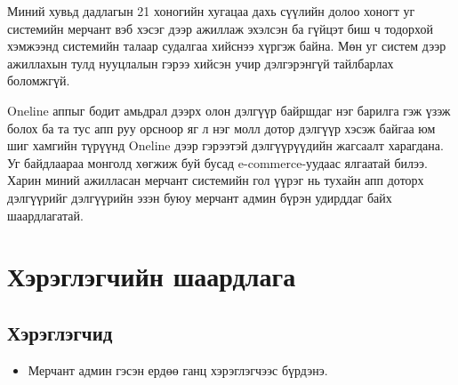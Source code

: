 Миний хувьд дадлагын 21 хоногийн хугацаа дахь сүүлийн долоо хоногт уг системийн мерчант вэб хэсэг дээр ажиллаж эхэлсэн ба гүйцэт биш ч тодорхой хэмжээнд системийн талаар судалгаа хийснээ хүргэж байна. Мөн уг систем дээр ажиллахын тулд нууцлалын гэрээ хийсэн учир дэлгэрэнгүй тайлбарлах боломжгүй. 

\quad \quad Oneline аппыг бодит амьдрал дээрх олон дэлгүүр байршдаг нэг барилга гэж үзэж болох ба та тус апп руу орсноор яг л нэг молл дотор дэлгүүр хэсэж байгаа юм шиг хамгийн түрүүнд Oneline дээр гэрээтэй дэлгүүрүүдийн жагсаалт харагдана. Уг байдлаараа монголд хөгжиж буй бусад  e-commerce-уудаас ялгаатай билээ. Харин миний ажилласан мерчант системийн гол үүрэг нь тухайн апп доторх дэлгүүрийг дэлгүүрийн эзэн буюу мерчант админ бүрэн удирддаг байх шаардлагатай.
\section{Хэрэглэгчийн шаардлага}
  \subsection{Хэрэглэгчид}
    \begin{itemize}
        \item Мерчант админ гэсэн ердөө ганц хэрэглэгчээс бүрдэнэ.
    \end{itemize}
